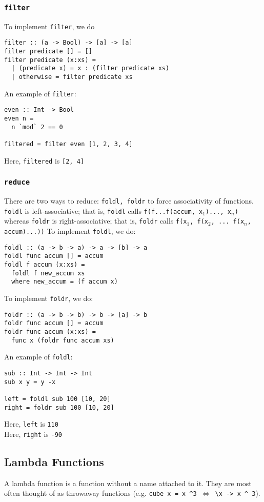 \documentclass{article}
\begin{document}
\subsubsection{\texttt{filter}} To implement \texttt{filter}, we do
\begin{verbatim}
filter :: (a -> Bool) -> [a] -> [a]
filter predicate [] = []
filter predicate (x:xs) =
  | (predicate x) = x : (filter predicate xs)
  | otherwise = filter predicate xs
\end{verbatim}
An example of \texttt{filter}:
\begin{verbatim}
even :: Int -> Bool
even n =
  n `mod` 2 == 0

filtered = filter even [1, 2, 3, 4]
\end{verbatim}
Here, \texttt{filtered} is \texttt{[2, 4]}

\subsubsection{\texttt{reduce}} There are two ways to reduce:
\texttt{foldl, foldr} to force associativity of
functions. \texttt{foldl} is left-associative; that is, \texttt{foldl}
calls \texttt{f(f...f(accum, x$_1$)..., x$_n$)} whereas \texttt{foldr} is
right-associative; that is, \texttt{foldr} calls \texttt{f(x$_1$, f(x$_2$,
  ... f(x$_n$, accum)...))} To implement \texttt{foldl}, we do:
\begin{verbatim}
foldl :: (a -> b -> a) -> a -> [b] -> a
foldl func accum [] = accum
foldl f accum (x:xs) =
  foldl f new_accum xs
  where new_accum = (f accum x)
\end{verbatim}
To implement \texttt{foldr}, we do:
\begin{verbatim}
foldr :: (a -> b -> b) -> b -> [a] -> b
foldr func accum [] = accum
foldr func accum (x:xs) =
  func x (foldr func accum xs)
\end{verbatim}
An example of \texttt{foldl}:
\begin{verbatim}
sub :: Int -> Int -> Int
sub x y = y -x

left = foldl sub 100 [10, 20]
right = foldr sub 100 [10, 20]
\end{verbatim}
Here, \texttt{left} is \texttt{110} \\
Here, \texttt{right} is \texttt{-90}





\subsection{Lambda Functions}
A lambda function is a function without a name attached to it. They
are most often thought of as throwaway functions (e.g. \texttt{cube x
  = x \textasciicircum 3 $\iff$ \textbackslash x -> x \textasciicircum
  3}).
\end{document}
